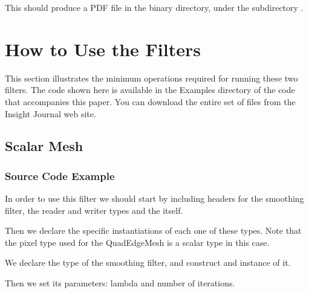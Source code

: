 \documentclass{InsightArticle}
\begin{document}
This should produce a PDF file in the binary directory, under the subdirectory
.

\section{How to Use the Filters}

This section illustrates the minimum operations required for running these two
filters. The code shown here is available in the Examples directory of the code
that accompanies this paper. You can download the entire set of files from the
Insight Journal web site.

\subsection{Scalar Mesh}

\subsubsection{Source Code Example}

In order to use this filter we should start by including headers for the
smoothing filter, the reader and writer types and the 
itself.

\begin{center}

\end{center}

Then we declare the specific instantiations of each one of these types. Note that the
pixel type used for the QuadEdgeMesh is a scalar type in this case.

\begin{center}

\end{center}

We declare the type of the smoothing filter, and construct and instance of it. 

\begin{center}

\end{center}

Then we set its parameters: lambda and number of iterations.

\begin{center}

\end{center}
\end{document}
